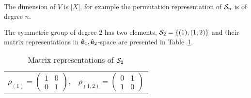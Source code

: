 	
	The dimension of $V$ is $|X|$, for example the permutation representation of $\mathcal{S}_n$ is of degree $n$.
	
	\begin{example}
		The symmetric group of degree 2 has two elements, $\mathcal{S}_2 = \{(1), (1,2)\}$ and their matrix representations in $\mathbf{\hat{e}}_1,\mathbf{\hat{e}}_2$-space are presented in Table~\ref{table:permS2}.
		\begin{table}[hbt!]
			\centering
			\begin{tabular}{c c}
				$\rho_{(1)} =
				\begin{pmatrix}
					1 & 0 \\ 0 & 1
				\end{pmatrix}$, &
				$\rho_{(1,2)} =
				\begin{pmatrix}
					0 & 1 \\ 1 & 0
				\end{pmatrix}$
			\end{tabular}
			\caption{Matrix representations of $\mathcal{S}_2$}
			\label{table:permS2}
		\end{table}
	\end{example}
	
